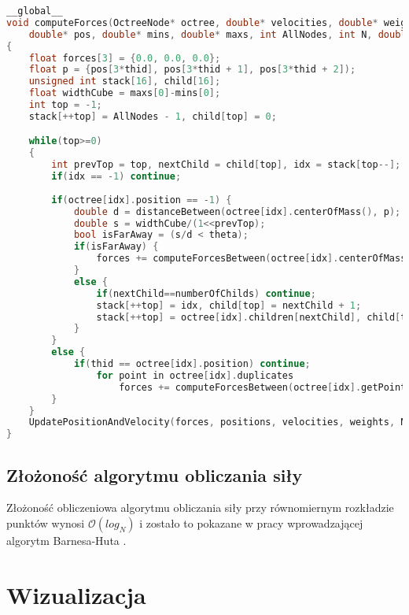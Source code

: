 \documentclass[14pt,twoside,a4paper]{article}
\theoremstyle{definition}
\begin{document}
\newpage
{} 
\begin{lstlisting}[language=C++, frame=single, framerule=2pt, caption=Obliczanie siły oddziałującej na ciało w układzie]
__global__
void computeForces(OctreeNode* octree, double* velocities, double* weights, 
    double* pos, double* mins, double* maxs, int AllNodes, int N, double dt) 
{	
    float forces[3] = {0.0, 0.0, 0.0};
    float p = {pos[3*thid], pos[3*thid + 1], pos[3*thid + 2]);
    unsigned int stack[16], child[16];
    float widthCube = maxs[0]-mins[0];
    int top = -1;
    stack[++top] = AllNodes - 1, child[top] = 0;

    while(top>=0) 
    {
    	int prevTop = top, nextChild = child[top], idx = stack[top--];
        if(idx == -1) continue;
        
        if(octree[idx].position == -1) {
            double d = distanceBetween(octree[idx].centerOfMass(), p);
            double s = widthCube/(1<<prevTop);
            bool isFarAway = (s/d < theta);
            if(isFarAway) {
            	forces += computeForcesBetween(octree[idx].centerOfMass, p);
            }
            else {
                if(nextChild==numberOfChilds) continue;
                stack[++top] = idx, child[top] = nextChild + 1;
                stack[++top] = octree[idx].children[nextChild], child[top] = 0;
            }
        } 
        else {
       	    if(thid == octree[idx].position) continue;
       	    	for point in octree[idx].duplicates
                    forces += computeForcesBetween(octree[idx].getPoint(point), p);	
        }
    }    
    UpdatePositionAndVelocity(forces, positions, velocities, weights, N, dt);
}
\end{lstlisting}

\subsection{Złożoność algorytmu obliczania siły}
Złożoność obliczeniowa algorytmu obliczania siły przy równomiernym rozkładzie punktów wynosi $\mathcal{O}(log_{N})$ i zostało to pokazane w pracy wprowadzającej algorytm Barnesa-Huta \cite{barnhut}.

\section{\LARGE Wizualizacja}
	
\end{document}
